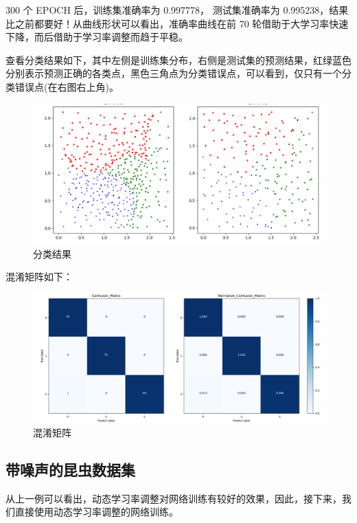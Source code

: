 \documentclass[12pt]{article}
\begin{document}
	300 个 EPOCH 后，训练集准确率为 0.997778， 测试集准确率为 0.995238，结果比之前都要好！从曲线形状可以看出，准确率曲线在前 70 轮借助于大学习率快速下降，而后借助于学习率调整而趋于平稳。
	
	查看分类结果如下，其中左侧是训练集分布，右侧是测试集的预测结果，红绿蓝色分别表示预测正确的各类点，黑色三角点为分类错误点，可以看到，仅只有一个分类错误点(在右图右上角)。
	
	\begin{figure}[H]
		\centering
		\includegraphics[width=5.7in]{./images/insects_normal_result.png}
		\centering
		\caption{分类结果}
	\end{figure}
	
	混淆矩阵如下：
	
	\begin{figure}[H]
		\centering
		\includegraphics[width=5.7in]{./images/insects_normal_confusion.png}
		\centering
		\caption{混淆矩阵}
	\end{figure}

	\subsection{带噪声的昆虫数据集}
	
	从上一例可以看出，动态学习率调整对网络训练有较好的效果，因此，接下来，我们直接使用动态学习率调整的网络训练。
	
\end{document}
